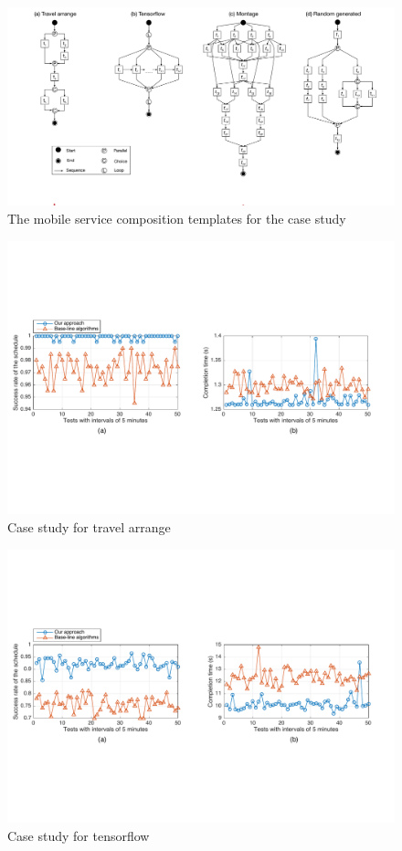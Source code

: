 \documentclass[journal]{IEEEtran}
\begin{document}
\begin{figure}[!t]
\centering
\includegraphics[width=6.8in]{./img/DAG.pdf}
\caption{The mobile service composition templates for the case study}
\label{DAG}
\end{figure}
\begin{figure}[!t]
\centering
\includegraphics[width=6.6in]{./img/Task-6.pdf}
\caption{Case study for travel arrange}
\label{Task-6}
\end{figure}
\begin{figure}[!t]
\centering
\includegraphics[width=6.6in]{./img/Task-12.pdf}
\caption{Case study for tensorflow}
\label{Task-12}
\end{figure}
\end{document}
